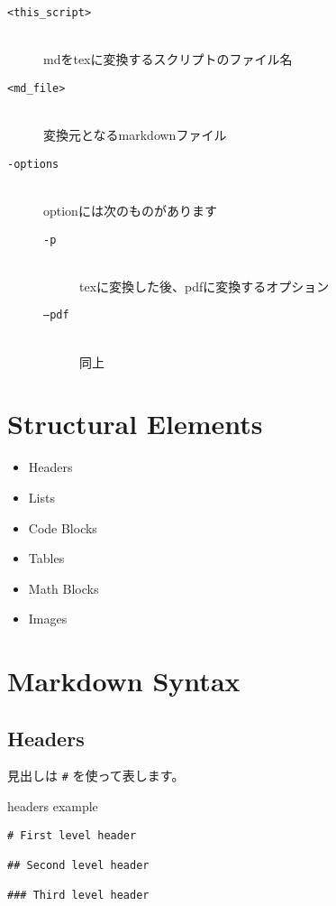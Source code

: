 \documentclass[a4j, titlepage]{jarticle}
\begin{document}
\begin{description}
\item[{\tt \textless{}this\_script\textgreater{}}]\mbox{}\\ mdをtexに変換するスクリプトのファイル名



\item[{\tt \textless{}md\_file\textgreater{}}]\mbox{}\\ 変換元となるmarkdownファイル



\item[{\tt -options}]\mbox{}\\ optionには次のものがあります


\begin{description}
\item[{\tt -p}]\mbox{}\\ texに変換した後、pdfに変換するオプション



\item[{\tt --pdf}]\mbox{}\\ 同上
\end{description}
\end{description}

\section{Structural Elements}

\begin{itemize}
\item Headers
\item Lists
\item Code Blocks
\item Tables
\item Math Blocks
\item Images
\end{itemize}

\section{Markdown Syntax}

\subsection{Headers}

見出しは {\tt \#} を使って表します。

\begin{itembox}[c]{headers example}
\begin{verbatim}
# First level header

## Second level header

### Third level header
\end{verbatim}
\end{itembox}
\end{document}
